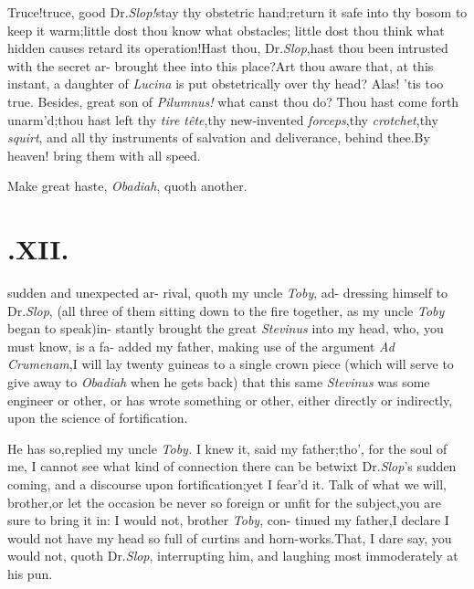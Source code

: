 \documentclass{article}
\begin{document}
Truce!\tsk truce, good Dr.\@ \textit{Slop!}\tsk stay thy
obstetric hand;\tsk return it safe into thy bosom to keep
it warm;\tsk little dost thou know what obstacles;\tsk
little dost thou think what hidden causes retard its
operation!\tsk Hast thou, Dr.\@ \textit{Slop},\tsk hast thou
been intrusted with the secret ar-\break
{} 
brought thee into this place?\tsk Art thou aware
that, at this instant, a daughter of \textit{Lucina} is put
obstetrically over thy head?\break
Alas! ’tis too true.\tsk
Besides, great son of \textit{Pilumnus!} what canst thou
do?\tsh\break
Thou hast come forth unarm’d;\tsk thou hast left thy
\textit{tire tête},\tsk thy new-invented
\textit{forceps},\tsk thy \textit{crotchet},\tsk thy
\textit{squirt}, and all thy instruments of salvation and
deliverance, behind thee.\tsk By heaven!
bring them with all speed.

\tsh Make great haste, \textit{Obadiah}, quoth 
another.

\null
\section{.\enspace  XII.}

 sudden and unexpected ar-\break
rival, quoth my uncle \textit{Toby}, ad-\break
dressing himself to Dr.\@ \textit{Slop},
(all three of them sitting down to the fire together, as my uncle
\textit{Toby} began to speak)\tsk in-\break
stantly brought the great \textit{Stevinus} into\break
my head, who, you must know, is a fa-
added my father, making use of the ar\-gument \textit{Ad
Crumenam},\tsh I will lay\break
twenty guineas to a single crown piece (which will serve to
give away to \textit{Obadiah} when he gets back) that this
same \textit{Stevinus} was some engineer or other,\tsk\break
or has wrote something or other, either directly or indirectly,
upon the science of\break
fortification.

He has so,\tsk replied my uncle \textit{Toby.}\tsk\break
I knew it, said my father;\tsk tho’, for the soul of me, I cannot see what kind
of connection there can be betwixt Dr.\@ \textit{Slop}’s sudden
coming, and a discourse upon fortification;\tsk yet I
fear’d it.\tsk\break
Talk of what we will, brother,\tsk or let the occasion be
never so foreign or unfit for the subject,\tsk you are sure
to bring it in: I would not, brother \textit{Toby}, con-
tinued my father,\tsh I declare I would not have my head
so full of curtins and horn-works.\tsh That, I dare say, you
would not, quoth Dr.\@ \textit{Slop}, interrupting him, and
laughing most immoderately at\break
his pun.
\end{document}
